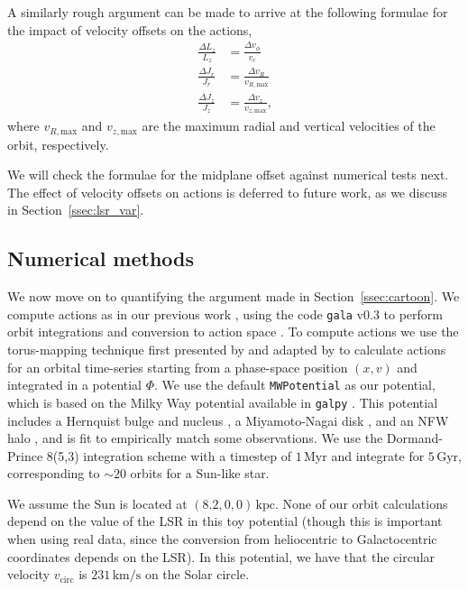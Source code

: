 \documentclass[twocolumn]{aastex62}
\newcommand{\kpc}{\text{kpc}}
\newcommand{\Myr}{\text{Myr}}
\newcommand{\Gyr}{\text{Gyr}}
\newcommand{\kms}{\text{km}/\text{s}}
\newcommand{\beq}{\begin{equation}}
\newcommand{\eeq}{\end{equation}}
\begin{document}
A similarly rough argument can be made to arrive at the following formulae for
the impact of velocity offsets on the actions,
\beq\label{eq:actions_epi_error}
\begin{split}
\frac{\Delta L_z}{L_z} &= \frac{\Delta v_{\phi}}{v_c} \\
\frac{\Delta J_r}{J_r} &= \frac{\Delta v_R}{v_{R,\text{max}}} \\
\frac{\Delta J_z}{J_z} &= \frac{\Delta v_z}{v_{z,\text{max}}}\text{,}
\end{split}
\eeq
where $v_{R,\text{max}}$ and $v_{z,\text{max}}$ are the maximum radial and
vertical velocities of the orbit, respectively.

We will check the formulae for the midplane offset against numerical tests
next. The effect of velocity offsets on actions is deferred to future work, as
we discuss in Section~\ref{ssec:lsr_var}.

\subsection{Numerical methods} \label{ssec:action_comp}
We now move on to quantifying the argument made in Section~\ref{ssec:cartoon}.
We compute actions as in our previous work \citep{2018ApJ...867...31B}, using
the code \texttt{gala} v0.3 to perform orbit integrations and conversion to
action space \citep{2017JOSS....2..388P,Price-Whelan:2018}. To compute actions
we use the torus-mapping technique first presented by
\citet{1990MNRAS.244..634M} and adapted by \citet{2014MNRAS.441.3284S} to
calculate actions for an orbital time-series starting from a phase-space
position $(x, v)$ and integrated in a potential $\Phi$. We use the default
\texttt{MWPotential} as our potential, which is based on the Milky Way
potential available in \texttt{galpy} \citep{2015ApJS..216...29B}. This
potential includes a Hernquist bulge and nucleus \citep{1990ApJ...356..359H},
a Miyamoto-Nagai disk \citep{1975PASJ...27..533M}, and an NFW halo
\citep{1997ApJ...490..493N}, and is fit to empirically match some
observations. We use the Dormand-Prince 8(5,3) integration scheme
\citep{Dormand80:integrator} with a timestep of $1\,\Myr$ and integrate for
$5\,\Gyr$, corresponding to $\sim 20$ orbits for a Sun-like star.

We assume the Sun is located at $(8.2, 0, 0)\,\kpc$. None of our orbit
calculations depend on the value of the LSR in this toy potential (though this
is important when using real data, since the conversion from heliocentric to
Galactocentric coordinates depends on the LSR). In this potential, we have
that the circular velocity $v_{\text{circ}}$ is $231\,\kms$ on the Solar
circle.
\end{document}
